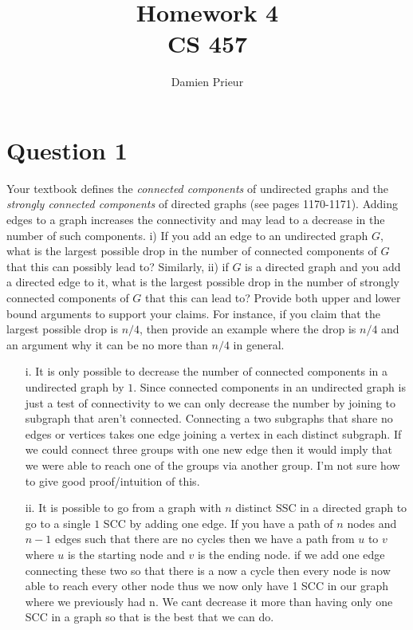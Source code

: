 \documentclass{article}
\author{Damien Prieur}
\title{Homework 4 \\ CS 457}
\date{}
\begin{document}
\maketitle

\section*{Question 1}
Your textbook defines the \emph{connected components} of undirected graphs and the \emph{strongly connected components} of directed graphs (see pages 1170-1171).
Adding edges to a graph increases the connectivity and may lead to a decrease in the number of such components.
i) If you add an edge to an undirected graph $G$, what is the largest possible drop in the number of connected components of $G$ that this can possibly lead to? Similarly,
ii) if $G$ is a directed graph and you add a directed edge to it, what is the largest possible drop in the number of strongly connected components of $G$ that this can lead to? Provide both upper and lower bound arguments to support your claims.
For instance, if you claim that the largest possible drop is $n/4$, then provide an example where the drop is $n/4$ and an argument why it can be no more than $n/4$ in general.

\begin{enumerate}
\item[i.] It is only possible to decrease the number of connected components in a undirected graph by $1$.
Since connected components in an undirected graph is just a test of connectivity to we can only decrease the number by joining to subgraph that aren't connected.
Connecting a two subgraphs that share no edges or vertices takes one edge joining a vertex in each distinct subgraph.
If we could connect three groups with one new edge then it would imply that we were able to reach one of the groups via another group.
I'm not sure how to give good proof/intuition of this.

\item[ii.] It is possible to go from a graph with $n$ distinct SSC in a directed graph to go to a single $1$ SCC by adding one edge.
If you have a path of $n$ nodes and $n-1$ edges such that there are no cycles then we have a path from $u$ to $v$ where $u$ is the starting node and $v$ is the ending node.
if we add one edge connecting these two so that there is a now a cycle then every node is now able to reach every other node thus we now only have 1 SCC in our graph where we previously had n.
We cant decrease it more than having only one SCC in a graph so that is the best that we can do.

\end{enumerate}
\end{document}
